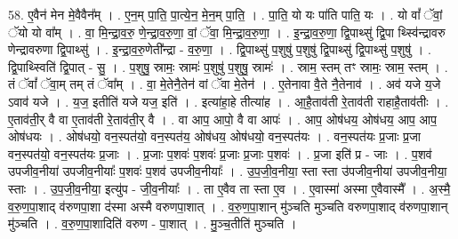 \documentclass[17pt]{extarticle}
\begin{document}
58. ए॒वैन॑ मेन मे॒वैवैन᳚म् । . ए॒न॒म् पा॒ति॒ पा॒त्ये॒न॒ मे॒न॒म् पा॒ति॒ । . पा॒ति॒ यो यः पा॑ति पाति॒ यः । . यो वां᳚ ॅवां॒ ॅयो यो वा᳚म् । . वा॒ मि॒न्द्रा॒व॒रु॒ णे॒न्द्रा॒व॒रु॒णा॒ वां॒ ॅवा॒ मि॒न्द्रा॒व॒रु॒णा॒ । . इ॒न्द्रा॒व॒रु॒णा॒ द्वि॒पाथ्सु॑ द्वि॒पा थ्स्वि॑न्द्रावरु णेन्द्रावरुणा द्वि॒पाथ्सु॑ । . इ॒न्द्रा॒व॒रु॒णेती᳚न्द्रा - व॒रु॒णा॒ । . द्वि॒पाथ्सु॑ प॒शुषु॑ प॒शुषु॑ द्वि॒पाथ्सु॑ द्वि॒पाथ्सु॑ प॒शुषु॑ । . द्वि॒पाथ्स्विति॑ द्वि॒पात् - सु॒ । . प॒शुषु॒ स्रामः॒ स्रामः॑ प॒शुषु॑ प॒शुषु॒ स्रामः॑ । . स्राम॒ स्तम् तꣳ स्रामः॒ स्राम॒ स्तम् । . तं ॅवां᳚ ॅवा॒म् तम् तं ॅवा᳚म् । . वा॒ मे॒तेनै॒तेन॑ वां ॅवा मे॒तेन॑ । . ए॒तेनावा वै॒ते नै॒तेनाव॑ । . अव॑ यजे य॒जे ऽवाव॑ यजे । . य॒ज॒ इतीति॑ यजे यज॒ इति॑ । . इत्या॑हा॒हे तीत्या॑ह । . आ॒है॒ताव॑ती रे॒ताव॑ती राहाहै॒ताव॑तीः । . ए॒ताव॑ती॒र् वै वा ए॒ताव॑ती रे॒ताव॑ती॒र् वै । . वा आप॒ आपो॒ वै वा आपः॑ । . आप॒ ओष॑धय॒ ओष॑धय॒ आप॒ आप॒ ओष॑धयः । . ओष॑धयो॒ वन॒स्पत॑यो॒ वन॒स्पत॑य॒ ओष॑धय॒ ओष॑धयो॒ वन॒स्पत॑यः । . वन॒स्पत॑यः प्र॒जाः प्र॒जा वन॒स्पत॑यो॒ वन॒स्पत॑यः प्र॒जाः । . प्र॒जाः प॒शवः॑ प॒शवः॑ प्र॒जाः प्र॒जाः प॒शवः॑ । . प्र॒जा इति॑ प्र - जाः । . प॒शव॑ उपजीव॒नीया॑ उपजीव॒नीयाः᳚ प॒शवः॑ प॒शव॑ उपजीव॒नीयाः᳚ । . उ॒प॒जी॒व॒नीया॒ स्ता स्ता उ॑पजीव॒नीया॑ उपजीव॒नीया॒ स्ताः । . उ॒प॒जी॒व॒नीया॒ इत्यु॑प - जी॒व॒नीयाः᳚ । . ता ए॒वैव ता स्ता ए॒व । . ए॒वास्मा॑ अस्मा ए॒वैवास्मै᳚ । . अ॒स्मै॒ व॒रु॒ण॒पा॒शाद् व॑रुणपा॒शा द॑स्मा अस्मै वरुणपा॒शात् । . व॒रु॒ण॒पा॒शान् मु॑ञ्चति मुञ्चति वरुणपा॒शाद् व॑रुणपा॒शान् मु॑ञ्चति । . व॒रु॒ण॒पा॒शादिति॑ वरुण - पा॒शात् । . मु॒ञ्च॒तीति॑ मुञ्चति । \newline
\end{document}
